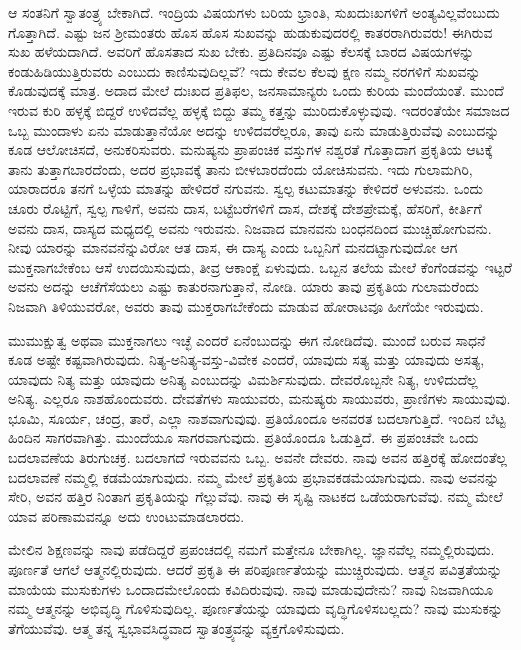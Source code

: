 ಆ ಸಂತನಿಗೆ ಸ್ವಾತಂತ್ರ್ಯ ಬೇಕಾಗಿದೆ. ಇಂದ್ರಿಯ ವಿಷಯಗಳು ಬರಿಯ ಭ್ರಾಂತಿ, ಸುಖದುಃಖಗಳಿಗೆ ಅಂತ್ಯವಿಲ್ಲವೆಂಬುದು ಗೊತ್ತಾಗಿದೆ. ಎಷ್ಟು ಜನ ಶ‍್ರೀಮಂತರು ಹೊಸ ಹೊಸ ಸುಖವನ್ನು ಹುಡುಕುವುದರಲ್ಲಿ ಕಾತರರಾಗಿರುವರು! ಈಗಿರುವ ಸುಖ ಹಳೆಯದಾಗಿದೆ. ಅವರಿಗೆ ಹೊಸತಾದ ಸುಖ ಬೇಕು. ಪ್ರತಿದಿನವೂ ಎಷ್ಟು ಕೆಲಸಕ್ಕೆ ಬಾರದ ವಿಷಯಗಳನ್ನು ಕಂಡುಹಿಡಿಯುತ್ತಿರುವರು ಎಂಬುದು ಕಾಣಿಸುವುದಿಲ್ಲವೆ? ಇದು ಕೇವಲ ಕೆಲವು ಕ್ಷಣ ನಮ್ಮ ನರಗಳಿಗೆ ಸುಖವನ್ನು ಕೊಡುವುದಕ್ಕೆ ಮಾತ್ರ. ಅದಾದ ಮೇಲೆ ದುಃಖದ ಪ್ರತಿಫಲ, ಜನಸಾಮಾನ್ಯರು ಒಂದು ಕುರಿಯ ಮಂದೆಯಂತೆ. ಮುಂದೆ ಇರುವ ಕುರಿ ಹಳ್ಳಕ್ಕೆ ಬಿದ್ದರೆ ಉಳಿದವೆಲ್ಲ ಹಳ್ಳಕ್ಕೆ ಬಿದ್ದು ತಮ್ಮ ಕತ್ತನ್ನು ಮುರಿದುಕೊಳ್ಳುವುವು. ಇದರಂತೆಯೇ ಸಮಾಜದ ಒಬ್ಬ ಮುಂದಾಳು ಏನು ಮಾಡುತ್ತಾನೆಯೋ ಅದನ್ನು ಉಳಿದವರೆಲ್ಲರೂ, ತಾವು ಏನು ಮಾಡುತ್ತಿರುವೆವು ಎಂಬುದನ್ನು ಕೂಡ ಆಲೋಚಿಸದೆ, ಅನುಕರಿಸುವರು. ಮನುಷ್ಯನು ಪ್ರಾಪಂಚಿಕ ವಸ್ತುಗಳ ನಶ್ವರತೆ ಗೊತ್ತಾದಾಗ ಪ್ರಕೃತಿಯ ಆಟಕ್ಕೆ ತಾನು ತುತ್ತಾಗಬಾರದೆಂದು, ಅದರ ಪ್ರಭಾವಕ್ಕೆ ತಾನು ಬೀಳಬಾರದೆಂದು ಯೋಚಿಸುವನು. ಇದು ಗುಲಾಮಗಿರಿ, ಯಾರಾದರೂ ತನಗೆ ಒಳ್ಳೆಯ ಮಾತನ್ನು ಹೇಳಿದರೆ ನಗುವನು. ಸ್ವಲ್ಪ ಕಟುಮಾತನ್ನು ಕೇಳಿದರೆ ಅಳುವನು. ಒಂದು ಚೂರು ರೊಟ್ಟಿಗೆ, ಸ್ವಲ್ಪ ಗಾಳಿಗೆ, ಅವನು ದಾಸ, ಬಟ್ಟೆಬರೆಗಳಿಗೆ ದಾಸ, ದೇಶಕ್ಕೆ ದೇಶಪ್ರೇಮಕ್ಕೆ, ಹೆಸರಿಗೆ, ಕೀರ್ತಿಗೆ ಅವನು ದಾಸ, ದಾಸ್ಯದ ಮಧ್ಯದಲ್ಲಿ ಅವನು ಇರುವನು. ನಿಜವಾದ ಮಾನವನು ಬಂಧನದಿಂದ ಮುಚ್ಚಿಹೋಗುವನು. ನೀವು ಯಾರನ್ನು ಮಾನವನೆನ್ನುವಿರೋ ಆತ ದಾಸ, ಈ ದಾಸ್ಯ ಎಂದು ಒಬ್ಬನಿಗೆ ಮನದಟ್ಟಾಗುವುದೋ ಆಗ ಮುಕ್ತನಾಗಬೇಕೆಂಬ ಆಸೆ ಉದಯಿಸುವುದು, ತೀವ್ರ ಆಕಾಂಕ್ಷೆ ಏಳುವುದು. ಒಬ್ಬನ ತಲೆಯ ಮೇಲೆ ಕೆಂಗೆಂಡವನ್ನು ಇಟ್ಟರೆ ಅವನು ಅದನ್ನು ಆಚೆಗೆಸೆಯಲು ಎಷ್ಟು ಕಾತುರನಾಗುತ್ತಾನೆ, ನೋಡಿ. ಯಾರು ತಾವು ಪ್ರಕೃತಿಯ ಗುಲಾಮರೆಂದು ನಿಜವಾಗಿ ತಿಳಿಯುವರೋ, ಅವರು ತಾವು ಮುಕ್ತರಾಗಬೇಕೆಂದು ಮಾಡುವ ಹೋರಾಟವೂ ಹೀಗೆಯೇ ಇರುವುದು.

ಮುಮುಕ್ಷುತ್ವ ಅಥವಾ ಮುಕ್ತನಾಗಲು ಇಚ್ಛೆ ಎಂದರೆ ಏನೆಂಬುದನ್ನು ಈಗ ನೋಡಿದೆವು. ಮುಂದೆ ಬರುವ ಸಾಧನೆ ಕೂಡ ಅಷ್ಟೇ ಕಷ್ಟವಾಗಿರುವುದು. ನಿತ್ಯ-ಅನಿತ್ಯ-\break ವಸ್ತು-ವಿವೇಕ ಎಂದರೆ, ಯಾವುದು ಸತ್ಯ ಮತ್ತು ಯಾವುದು ಅಸತ್ಯ, ಯಾವುದು ನಿತ್ಯ ಮತ್ತು ಯಾವುದು ಅನಿತ್ಯ ಎಂಬುದನ್ನು ವಿಮರ್ಶಿಸುವುದು. ದೇವರೊಬ್ಬನೇ ನಿತ್ಯ, ಉಳಿದುದೆಲ್ಲ ಅನಿತ್ಯ. ಎಲ್ಲರೂ ನಾಶಹೊಂದುವರು. ದೇವತೆಗಳು ಸಾಯುವರು, ಮನುಷ್ಯರು ಸಾಯುವರು, ಪ್ರಾಣಿಗಳು ಸಾಯುವುವು. ಭೂಮಿ, ಸೂರ್ಯ, ಚಂದ್ರ, ತಾರೆ, ಎಲ್ಲಾ ನಾಶವಾಗುವುವು. ಪ್ರತಿಯೊಂದೂ ಅನವರತ ಬದಲಾಗುತ್ತಿದೆ. ಇಂದಿನ ಬೆಟ್ಟ ಹಿಂದಿನ ಸಾಗರವಾಗಿತ್ತು. ಮುಂದೆಯೂ ಸಾಗರವಾಗುವುದು. ಪ್ರತಿಯೊಂದೂ ಓಡುತ್ತಿದೆ. ಈ ಪ್ರಪಂಚವೇ ಒಂದು ಬದಲಾವಣೆಯ ತಿರುಗುಚಕ್ರ. ಬದಲಾಗದೆ ಇರುವವನು ಒಬ್ಬ. ಅವನೇ ದೇವರು. ನಾವು ಅವನ ಹತ್ತಿರಕ್ಕೆ ಹೋದಂತೆಲ್ಲ ಬದಲಾವಣೆ ನಮ್ಮಲ್ಲಿ ಕಡಮೆಯಾಗುವುದು. ನಮ್ಮ ಮೇಲೆ ಪ್ರಕೃತಿಯ ಪ್ರಭಾವ\break ಕಡಮೆಯಾಗುವುದು. ನಾವು ಅವನನ್ನು ಸೇರಿ, ಅವನ ಹತ್ತಿರ ನಿಂತಾಗ ಪ್ರಕೃತಿಯನ್ನು ಗೆಲ್ಲುವೆವು. ನಾವು ಈ ಸೃಷ್ಟಿ ನಾಟಕದ ಒಡೆಯರಾಗುವೆವು. ನಮ್ಮ ಮೇಲೆ ಯಾವ ಪರಿಣಾಮವನ್ನೂ ಅದು ಉಂಟುಮಾಡಲಾರದು.

ಮೇಲಿನ ಶಿಕ್ಷಣವನ್ನು ನಾವು ಪಡೆದಿದ್ದರೆ ಪ್ರಪಂಚದಲ್ಲಿ ನಮಗೆ ಮತ್ತೇನೂ ಬೇಕಾಗಿಲ್ಲ. ಜ್ಞಾನವೆಲ್ಲ ನಮ್ಮಲ್ಲಿರುವುದು. ಪೂರ್ಣತೆ ಆಗಲೆ ಆತ್ಮನಲ್ಲಿರುವುದು. ಆದರೆ ಪ್ರಕೃತಿ ಈ ಪರಿಪೂರ್ಣತೆಯನ್ನು ಮುಚ್ಚಿರುವುದು. ಆತ್ಮನ ಪವಿತ್ರತೆಯನ್ನು ಮಾಯೆಯ ಮುಸುಕುಗಳು ಒಂದಾದಮೇಲೊಂದು ಕವಿದಿರುವುವು. ನಾವು ಮಾಡುವುದೇನು? ನಾವು ನಿಜವಾಗಿಯೂ ನಮ್ಮ ಆತ್ಮನನ್ನು ಅಭಿವೃದ್ಧಿ ಗೊಳಿಸುವುದಿಲ್ಲ. ಪೂರ್ಣತೆಯನ್ನು ಯಾವುದು ವೃದ್ಧಿಗೊಳಿಸಬಲ್ಲದು? ನಾವು ಮುಸುಕನ್ನು ತೆಗೆಯುವೆವು. ಆತ್ಮ ತನ್ನ ಸ್ವಭಾವಸಿದ್ಧವಾದ ಸ್ವಾತಂತ್ರ್ಯವನ್ನು ವ್ಯಕ್ತಗೊಳಿಸುವುದು.


